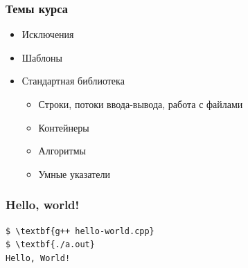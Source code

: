 \documentclass[compress]{beamer}
\begin{document}
\begin{frame}

    \frametitle{Темы курса}

    \begin{itemize}

        \item Исключения

        \item Шаблоны

        \item Стандартная библиотека

            \begin{itemize}

                \item Строки, потоки ввода-вывода, работа с файлами

                \item Контейнеры

                \item Алгоритмы

                \item Умные указатели

            \end{itemize}

    \end{itemize}

\end{frame}

\begin{frame}[fragile]

    \frametitle{Hello, world!}


    \begin{Verbatim}[frame=single, fontsize=\footnotesize, commandchars=\\\{\}]
$ \textbf{g++ hello-world.cpp}
$ \textbf{./a.out}
Hello, World!
    \end{Verbatim}

\end{frame}
\end{document}
